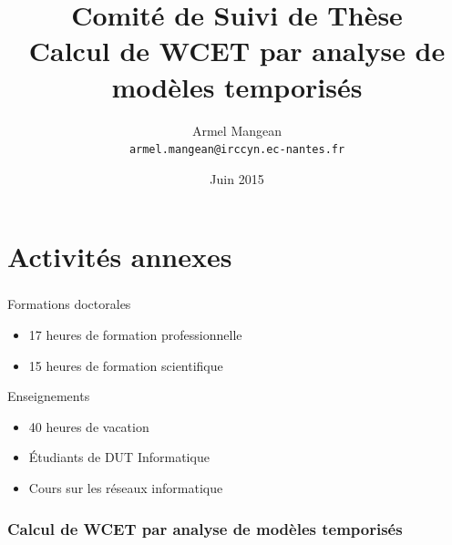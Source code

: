 \documentclass{beamer}
\title{%
  Comité de Suivi de Thèse \\
  {\bf Calcul de WCET par analyse de modèles temporisés}}
\author{%
  Armel Mangean \\
  {\small\tt armel.mangean@irccyn.ec-nantes.fr}}
\institute{%
  École Centrale de Nantes \\
  IRCCyN, équipe Sytème Temps-Réel}
\date{Juin 2015}
\begin{document}
  \begin{frame}
    \small
    \titlepage
  \end{frame}

  \section*{Activités annexes}
  \begin{frame}
    \frametitle{\secname}

    \begin{block}{Formations doctorales}
      \begin{itemize}
        \item 17 heures de formation professionnelle
        \item 15 heures de formation scientifique
      \end{itemize}
    \end{block}

    \begin{block}{Enseignements}
      \begin{itemize}
        \item 40 heures de vacation
        \item Étudiants de DUT Informatique
        \item Cours sur les réseaux informatique
      \end{itemize}
    \end{block}
  \end{frame}

  \begin{frame}
    \frametitle{Calcul de WCET par analyse de modèles temporisés}
    \tableofcontents
  \end{frame}

\end{document}
